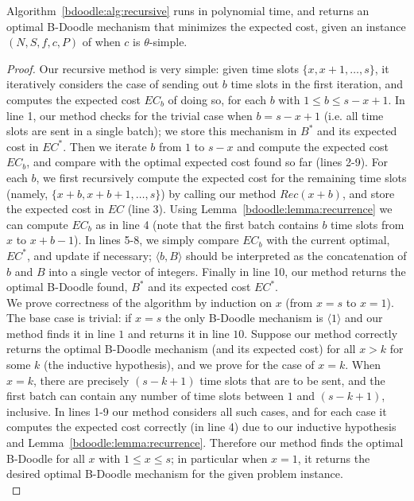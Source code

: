 \begin{theorem} \label{bdoodle:thm:recursive_algo}
Algorithm~\ref{bdoodle:alg:recursive} runs in polynomial time, and returns an optimal B-Doodle mechanism that minimizes the expected cost, given an instance $(N, S, f, c, P)$ of \BDPs when $c$ is $\theta$-simple.
\end{theorem}
\begin{proof}
Our recursive method is very simple: given time slots $\{x, x+1, \dots, s\}$, it iteratively considers the case of sending out $b$ time slots in the first iteration, and computes the expected cost $EC_b$ of doing so, for each $b$ with $1 \leq b \leq s-x+1$.  In line 1, our method checks for the trivial case when $b = s-x+1$ (i.e. all time slots are sent in a single batch); we store this mechanism in $B^*$ and its expected cost in $EC^*$. Then we iterate $b$ from $1$ to $s-x$ and compute the expected cost $EC_b$, and compare with the optimal expected cost found so far (lines 2-9). For each $b$, we first recursively compute the expected cost for the remaining time slots (namely, $\{x+b, x+b+1, \dots, s\}$) by calling our method $Rec(x+b)$, and store the expected cost in $EC$ (line 3). Using Lemma~\ref{bdoodle:lemma:recurrence} we can compute $EC_b$ as in line 4 (note that the first batch contains $b$ time slots from $x$ to $x+b-1$). In lines 5-8, we simply compare $EC_b$ with the current optimal, $EC^*$, and update if necessary; $\langle b, B \rangle$ should be interpreted as the concatenation of $b$ and $B$ into a single vector of integers. Finally in line 10, our method returns the optimal B-Doodle found, $B^*$ and its expected cost $EC^*$. \\

We prove correctness of the algorithm by induction on $x$ (from $x = s$ to $x = 1$). The base case is trivial: if $x = s$ the only B-Doodle mechanism is $\langle 1 \rangle$ and our method finds it in line $1$ and returns it in line $10$. Suppose our method correctly returns the optimal B-Doodle mechanism (and its expected cost) for all $x > k$ for some $k$ (the inductive hypothesis), and we prove for the case of $x = k$. When $x = k$, there are precisely $(s-k+1)$ time slots that are to be sent, and the first batch can contain any number of time slots between $1$ and $(s-k+1)$, inclusive. In lines 1-9 our method considers all such cases, and for each case it computes the expected cost correctly (in line 4) due to our inductive hypothesis and Lemma~\ref{bdoodle:lemma:recurrence}. Therefore our method finds the optimal B-Doodle for all $x$ with $1 \leq x \leq s$; in particular when $x = 1$, it returns the desired optimal B-Doodle mechanism for the given problem instance.\\


\end{proof}
